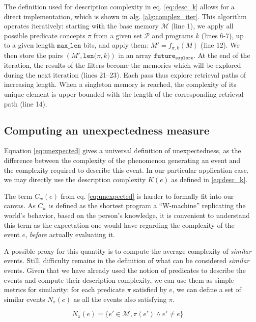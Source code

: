 \documentclass[conference]{IEEEtran}
\begin{document}
The definition used for description complexity in eq. \ref{eq:desc_k} allows for
a direct implementation, which is shown in alg. \ref{alg:complex_iter}. This
algorithm operates iteratively: starting with the base memory $\mathcal{M}$
(line 1), we apply all possible predicate concepts $\pi$ from a given set
$\mathcal{P}$ and programs $k$ (lines 6-7), up to a given length
$\mathtt{max\_len}$ bits, and apply them: $M' = f_{\pi, k}(M)$ (line 12). We
then store the pairs $(M', \mathtt{len(}\pi, k\mathtt{)})$ in an array
$\mathtt{future_{explore}}$. At the end of the iteration, the results of the
filters become the memories which will be explored during the next iteration
(lines 21--23). Each pass thus explore retrieval paths of increasing length.
When a singleton memory is reached, the complexity of its unique element is
upper-bounded with the length of the corresponding retrieval path (line 14).


\subsection{Computing an unexpectedness measure}
Equation \ref{eq:unexpected} gives a universal definition of unexpectedness, as
the difference between the complexity of the phenomenon generating an event and
the complexity required to describe this event. In our particular application
case, we may directly use the description complexity $K(e)$ as defined in
\ref{eq:desc_k}.

The term $C_{w}(e)$ from eq. \ref{eq:unexpected} is harder to formally
fit into our canvas. As $C_{w}$ is defined as the shortest program a
``W-machine'' replicating the world's behavior, based on the person's
knowledge\cite{dessalles2011coincidences}, it is convenient to understand this
term as the expectation one would have regarding the complexity of the event
$e$, \emph{before} actually evaluating it.

A possible proxy for this quantity is to compute the average complexity
of \emph{similar} events. Still, difficulty remains in the definition of what
can be considered \emph{similar} events. Given that we have already used the
notion of predicates to describe the events and compute their description
complexity, we can use them as simple metrics for similarity: for each predicate
$\pi$ satisfied by $e$, we can define a set of similar events $N_{\pi}(e)$ as
all the events also satisfying $\pi$.

\begin{equation}
\label{eq:similar}
N_{\pi}(e) = \{e'\in \mathcal{M}, \pi(e') \wedge e' \neq e\}
\end{equation}
\end{document}
